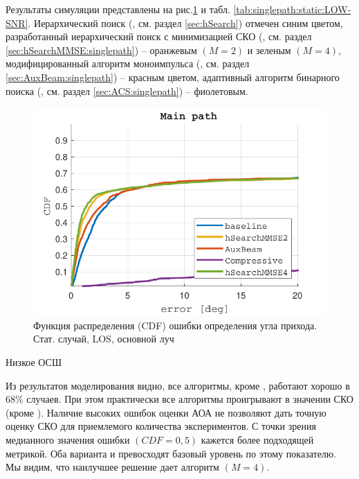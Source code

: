 Результаты симуляции представлены на рис.\ref{fig:singlepath:static:LOW-SNR} и
табл.  \ref{tab:singlepath:static:LOW-SNR}.  Иерархический поиск (\baseline{},
см.  раздел \ref{sec:hSearch}) отмечен синим цветом, разработанный иерархический
поиск с минимизацией СКО (\hSearchMMSE{}, см. раздел
\ref{sec:hSearchMMSE:singlepath}) -- оранжевым $(M=2)$ и зеленым $(M=4)$,
модифицированный алгоритм моноимпульса (\AuxBeam{}, см. раздел
\ref{sec:AuxBeam:singlepath}) -- красным цветом, адаптивный алгоритм бинарного
поиска (\ACS{}, см. раздел \ref{sec:ACS:singlepath}) -- фиолетовым.
\begin{figure}[ht]
  \centering
  \includegraphics{results/rus/singlepath-static-LOW-SNR-1}
  \caption{Функция распределения (CDF) ошибки определения угла прихода. Стат. случай, LOS, основной луч}
  \label{fig:singlepath:static:LOW-SNR}
\end{figure}

\begin{table}[h!]
  \begin{center}
    \caption{Низкое ОСШ}
    \small
    \label{tab:singlepath:static:LOW-SNR}
  \end{center}
\end{table}


Из результатов моделирования видно, все алгоритмы, кроме \ACS{}, работают хорошо в
68\% случаев. При этом практически все алгоритмы проигрывают \baseline{} в
значении СКО (кроме \AuxBeam{}). Наличие высоких ошибок оценки
АОА не позволяют дать точную оценку СКО для приемлемого количества
экспериментов. С точки зрения медианного значения ошибки $(CDF = 0,5)$
кажется более подходящей метрикой. Оба варианта \hSearchMMSE{} и \AuxBeam{}
превосходят базовый уровень по этому показателю.  Мы видим, что наилучшее
решение дает алгоритм \hSearchMMSE{} $(M = 4)$.  

